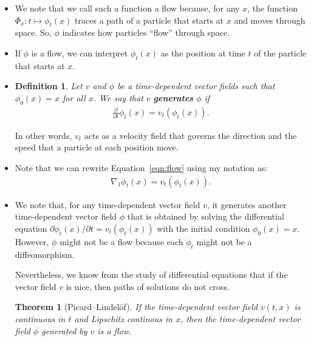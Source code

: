 \documentclass[10pt]{article}
\newtheorem{theorem}[lemma]{Theorem}
\newtheorem{definition}[lemma]{Definition}
\begin{document}
\begin{itemize}
  \item We note that we call such a function a flow because, for any $x$, the function $\Phi_{x}: t \mapsto \phi_t(x)$ traces a path of a particle that starts at $x$ and moves through space. So, $\phi$ indicates how particles ``flow'' through space. 
  
  \item If $\phi$ is a flow, we can interpret $\phi_t(x)$ as the position at time $t$ of the particle that starts at $x$.
  
  \item \begin{definition}
    Let $v$ and $\phi$ be a time-dependent vector fields such that $\phi_0(x) = x$ for all $x$. We say that $v$ {\bf generates} $\phi$ if
    \begin{align}
      \frac{\partial}{\partial t} \phi_t(x) = v_t(\phi_t(x)). \label{eqn:flow}
    \end{align}
  \end{definition}
  In other words, $v_t$ acts as a velocity field that governs the direction and the speed that a particle at each position move.

  \item Note that we can rewrite Equation~\eqref{eqn:flow} using my notation \cite{Khungurn:Notation} as:
  \begin{align}
    \nabla_1 \phi_t(x) = v_t(\phi_t(x)). \label{eqn:flow-my-notation}
  \end{align}

  \item We note that, for any time-dependent vector field $v$, it generates another time-dependent vector field $\phi$ that is obtained by solving the differential equation $\partial \phi_t(x) / \partial t = v_t(\phi_t(x))$ with the initial condition $\phi_0(x) = x$. However, $\phi$ might not be a flow because each $\phi_t$ might not be a diffeomorphism.
  
  Nevertheless, we know from the study of differential equations that if the vector field $v$ is nice, then paths of solutions do not cross.

  \begin{theorem}[Picard--Lindel\"{o}f]
    If the time-dependent vector field $v(t,x)$ is continuous in $t$ and Lipschitz continous in $x$, then the time-dependent vector field $\phi$ generated by $v$ is a flow.
  \end{theorem}


\end{itemize}
\end{document}
